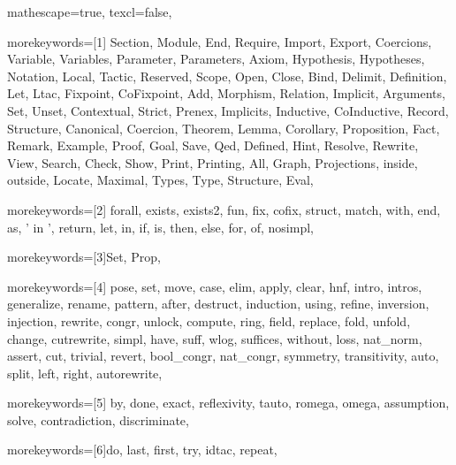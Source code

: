 
 {

mathescape=true,
texcl=false,

morekeywords=[1]{
  Section, Module, End, Require, Import, Export, Coercions,
  Variable, Variables, Parameter, Parameters, Axiom, Hypothesis, Hypotheses,
  Notation, Local, Tactic, Reserved, Scope, Open, Close, Bind, Delimit,
  Definition, Let, Ltac, Fixpoint, CoFixpoint, Add, Morphism, Relation,
  Implicit, Arguments, Set, Unset, Contextual, Strict, Prenex, Implicits,
  Inductive, CoInductive, Record, Structure, Canonical, Coercion,
  Theorem, Lemma, Corollary, Proposition, Fact, Remark, Example,
  Proof, Goal, Save, Qed, Defined, Hint, Resolve, Rewrite, View,
  Search, Check, Show, Print, Printing, All, Graph, Projections, inside,
  outside, Locate, Maximal, Types, Type, Structure, Eval},

morekeywords=[2]{
  forall, exists, exists2, fun, fix, cofix, struct,
  match, with, end, as, ' in ', return, let, in, if, is, then, else,
  for, of, nosimpl},

morekeywords=[3]{Set, Prop},

morekeywords=[4]{
  pose, set, move, case, elim, apply, clear,
  hnf, intro, intros, generalize, rename, pattern, after,
  destruct, induction, using, refine, inversion, injection,
  rewrite, congr, unlock, compute, ring, field,
  replace, fold, unfold, change, cutrewrite, simpl,
  have, suff, wlog, suffices, without, loss, nat_norm,
  assert, cut, trivial, revert, bool_congr, nat_congr,
  symmetry, transitivity, auto, split, left, right, autorewrite},

morekeywords=[5]{
  by, done, exact, reflexivity, tauto, romega, omega,
  assumption, solve, contradiction, discriminate},

morekeywords=[6]{do, last, first, try, idtac, repeat},


}
